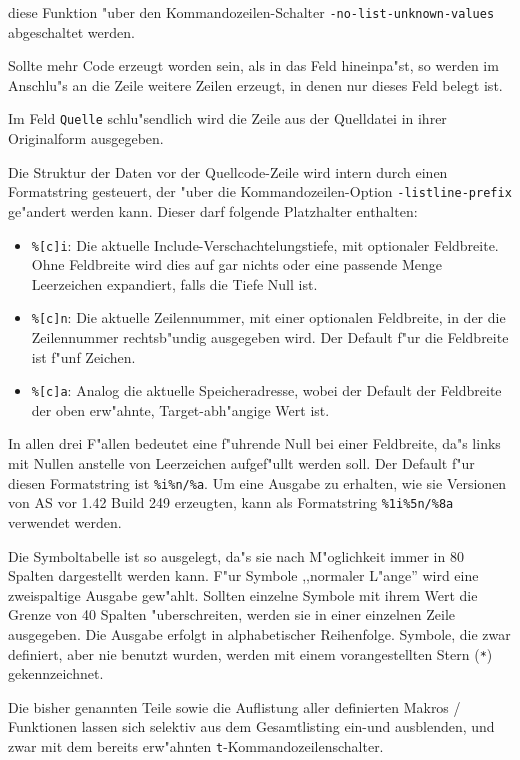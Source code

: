 \documentclass[12pt,a4paper,twoside]{report}
\newcommand{\tty}[1]{{\tt #1}}
\newcommand{\asname}{AS}
\begin{document}
diese Funktion "uber den Kommandozeilen-Schalter \tty{-no-list-unknown-values}
abgeschaltet werden.
\par
Sollte mehr Code erzeugt worden sein, als in das Feld hineinpa"st, so
werden im Anschlu"s an die Zeile weitere Zeilen erzeugt, in denen nur
dieses Feld belegt ist.
\par
Im Feld \tty{Quelle} schlu"sendlich wird die Zeile aus der Quelldatei in
ihrer Originalform ausgegeben.
\par
Die Struktur der Daten vor der Quellcode-Zeile wird intern
durch einen Formatstring gesteuert, der "uber die Kommandozeilen-Option
{\tt -listline-prefix} ge"andert werden kann.  Dieser darf folgende
Platzhalter enthalten:
\begin{itemize}
\item{{\tt \%[c]i}: Die aktuelle Include-Verschachtelungstiefe, mit optionaler
      Feldbreite.  Ohne Feldbreite wird dies auf gar nichts oder eine
      passende Menge Leerzeichen expandiert, falls die Tiefe Null ist.}
\item{{\tt \%[c]n}: Die aktuelle Zeilennummer, mit einer optionalen Feldbreite,
      in der die Zeilennummer rechtsb"undig ausgegeben wird.  Der Default
      f"ur die Feldbreite ist f"unf Zeichen.}
\item{{\tt \%[c]a}: Analog die aktuelle Speicheradresse, wobei der Default
      der Feldbreite der oben erw"ahnte, Target-abh"angige Wert ist.}
\end{itemize}
In allen drei F"allen bedeutet eine f"uhrende Null bei einer Feldbreite, da"s
links mit Nullen anstelle von Leerzeichen aufgef"ullt werden soll.
Der Default f"ur diesen Formatstring ist \verb!%i%n/%a!.  Um eine Ausgabe
zu erhalten, wie sie Versionen von \asname{} vor 1.42 Build 249 erzeugten,
kann als Formatstring \verb!%1i%5n/%8a! verwendet werden.
\par
Die Symboltabelle ist so ausgelegt, da"s sie nach M"oglichkeit immer in 80
Spalten dargestellt werden kann.  F"ur Symbole ,,normaler L"ange'' wird
eine zweispaltige Ausgabe gew"ahlt.  Sollten einzelne Symbole mit ihrem
Wert die Grenze von 40 Spalten "uberschreiten, werden sie in einer
einzelnen Zeile ausgegeben.  Die Ausgabe erfolgt in alphabetischer
Reihenfolge.  Symbole, die zwar definiert, aber nie benutzt wurden,
werden mit einem vorangestellten Stern (\verb!*!) gekennzeichnet.
\par
Die bisher genannten Teile sowie die Auflistung aller definierten
Makros / Funktionen lassen sich selektiv aus dem Gesamtlisting ein-und
ausblenden, und zwar mit dem bereits erw"ahnten \tty{t}-Kommandozeilenschalter.
\end{document}
